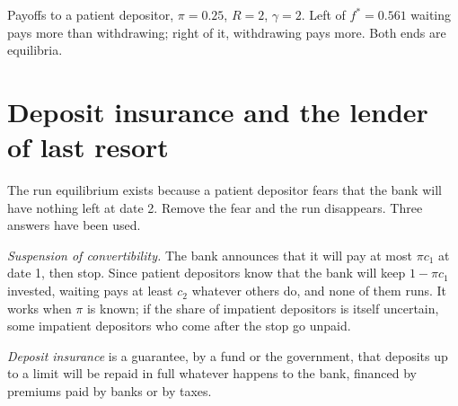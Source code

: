 \begin{omfigure}

{\small Payoffs to a patient depositor, $\pi = 0.25$, $R = 2$, $\gamma = 2$. Left of $f^* = 0.561$ waiting pays more than
withdrawing; right of it, withdrawing pays more. Both ends are equilibria.}
\end{omfigure}

\section{Deposit insurance and the lender of last resort}\label{sec:b2:banks-and-crises:insurance}

The run equilibrium exists because a patient depositor fears that the bank will have nothing left at date 2. Remove the
fear and the run disappears. Three answers have been used.

\emph{Suspension of convertibility.} The bank announces that it will pay at most $\pi c_1$ at date 1, then stop. Since
patient depositors know that the bank will keep $1 - \pi c_1$ invested, waiting pays at least $c_2$ whatever others do, and
none of them runs. It works when $\pi$ is known; if the share of impatient depositors is itself uncertain, some impatient
depositors who come after the stop go unpaid.

\begin{definition}\label{def:b2:banks-and-crises:deposit-insurance}
\emph{Deposit insurance} is a guarantee, by a fund or the government, that deposits up to a limit
will be repaid in full whatever happens to the bank, financed by premiums paid by banks or by taxes.
\end{definition}


